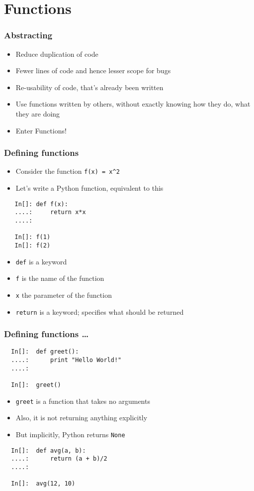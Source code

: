 \section{Functions}

\begin{frame}[fragile]
  \frametitle{Abstracting}
  \begin{itemize}
  \item Reduce duplication of code
  \item Fewer lines of code and hence lesser scope for bugs
  \item Re-usability of code, that's already been written
  \item Use functions written by others, without exactly knowing how
    they do, what they are doing
  \item \alert{Enter Functions!}
  \end{itemize}
\end{frame}


\begin{frame}[fragile]
  \frametitle{Defining functions}
  \begin{itemize}
  \item Consider the function \texttt{f(x) = x\textasciicircum{}2}
  \item Let's write a Python function, equivalent to this
  \end{itemize}
  \begin{lstlisting}
   In[]: def f(x):
   ....:     return x*x
   ....:

   In[]: f(1)
   In[]: f(2)
  \end{lstlisting}
  \begin{itemize}
  \item \texttt{def} is a keyword  
  \item \texttt{f} is the name of the function 
  \item \texttt{x} the parameter of the function
  \item \texttt{return} is a keyword; specifies what should be
    returned
  \end{itemize}
\end{frame}

\begin{frame}[fragile]
  \frametitle{Defining functions \ldots}
  \begin{lstlisting}
  In[]:  def greet():
  ....:      print "Hello World!"
  ....:

  In[]:  greet()
  \end{lstlisting}
  \begin{itemize}
  \item \texttt{greet} is a function that takes no arguments
  \item Also, it is not returning anything explicitly
  \item But implicitly, Python returns \texttt{None}
  \end{itemize}
  \begin{lstlisting}
  In[]:  def avg(a, b):
  ....:      return (a + b)/2
  ....:
      
  In[]:  avg(12, 10)
  \end{lstlisting}
\end{frame}

